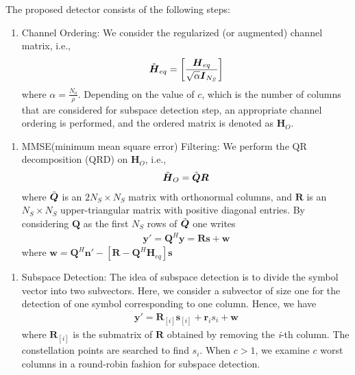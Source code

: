 \documentclass{beamer}
\newcounter{saveenumi}
\newcommand{\seti}{\setcounter{saveenumi}{\value{enumi}}}
\newcommand{\conti}{\setcounter{enumi}{\value{saveenumi}}}
\begin{document}
\begin{frame}{}
  The proposed detector consists of the following steps:
  \begin{enumerate}
      \item Channel Ordering:  We consider the regularized
    (or augmented) channel matrix, i.e.,
    \begin{align}
        \Tilde{\boldsymbol{H}}_{eq} = \left[ \frac{\boldsymbol{H}_{eq}}{\sqrt{\alpha}\boldsymbol{I}_{N_S}} \right]
    \end{align}
    where $\alpha = \frac{N_o}{\rho}$. Depending on the value of $c$, which is the number of columns that are considered for subspace detection step, an appropriate channel ordering is performed, and the ordered matrix is denoted as $\boldsymbol{H}_O$.
    \seti
  \end{enumerate}
\end{frame}

\begin{frame}{}
    \begin{enumerate}
    \conti
    \item MMSE(minimum mean square error) Filtering: We perform the QR decomposition (QRD)
    on $\boldsymbol{H}_O$, i.e.,
    \begin{align}
         \Tilde{\boldsymbol{H}}_{O} = \Tilde{\boldsymbol{Q}}\boldsymbol{R}
    \end{align}
    where $\Tilde{\boldsymbol{Q}}$ is an $2N_S \times N_S$ matrix with orthonormal columns, and $\boldsymbol{R}$ is an $N_S \times N_S$ upper-triangular matrix with positive diagonal entries.
        By considering $\boldsymbol{Q}$ as the first $N_S$ rows of $\Tilde{\boldsymbol{Q}}$ one writes
        \begin{align}
            \boldsymbol{y'} = \boldsymbol{Q}^H\boldsymbol{y} = \boldsymbol{Rs}+\boldsymbol{w}
        \end{align}
        where $\boldsymbol{w} = \boldsymbol{Q}^H\boldsymbol{n'} - \left[ \boldsymbol{R} - \boldsymbol{Q}^H\boldsymbol{H}_{eq} \right]\boldsymbol{s}$ 
        \seti
    \end{enumerate}
\end{frame}

\begin{frame}{}
    \begin{enumerate}
        \conti
        \item Subspace Detection: The idea of subspace detection is to divide the symbol vector into two subvectors. Here, we consider a subvector of size one for the detection of one symbol corresponding to one column. Hence, we have
        \begin{align}
            \boldsymbol{y'} = \boldsymbol{R}_{[i]}\boldsymbol{s}_{[i]}+\boldsymbol{r}_is_i+\boldsymbol{w}
        \end{align}
        where $\boldsymbol{R}_{[i]}$ is the submatrix of $\boldsymbol{R}$ obtained by removing the \textit{i}-th column. The constellation points are searched to find $s_i$. When $c>1$, we examine $c$ worst columns in a round-robin fashion for subspace detection.
        \seti
    \end{enumerate}
\end{frame}
\end{document}
